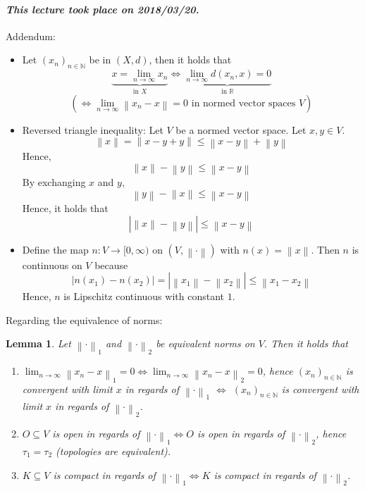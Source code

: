 \documentclass{article}
\newtheorem{lemma}{Lemma}  \numberwithin{lemma}{section}
\newcommand{\norm}[1]{\left\|#1\right\|}
\newcommand{\card}[1]{\left|#1\right|}
\newcommand{\dateref}[1]{\paragraph{\textit{This lecture took place on #1.}}}
\begin{document}
\dateref{2018/03/20}

Addendum:
\begin{itemize}
  \item Let $(x_n)_{n \in \mathbb N}$ be in $(X, d)$, then it holds that
    \[ \underbrace{x = \lim_{n\to\infty} x_n}_{\text{in } X} \iff \underbrace{\lim_{n\to\infty} d(x_n, x) = 0}_{\text{in } \mathbb R} \]
    \[ (\iff \lim_{n\to\infty} \norm{x_n - x} = 0 \text{ in normed vector spaces } V) \]
  \item Reversed triangle inequality: Let $V$ be a normed vector space. Let $x, y \in V$.
    \[ \norm{x} = \norm{x - y + y} \leq \norm{x - y} + \norm{y} \]
    Hence,
    \[ \norm{x} - \norm{y} \leq \norm{x - y} \]
    By exchanging $x$ and $y$,
    \[ \norm{y} - \norm{x} \leq \norm{x - y} \]
    Hence, it holds that
    \[ \card{\norm x - \norm y} \leq \norm{x - y} \]
  \item Define the map $n: V \to [0, \infty)$ on $(V, \norm{\cdot})$ with $n(x) = \norm{x}$.
    Then $n$ is continuous on $V$ because
    \[ \card{n(x_1) - n(x_2)} = \card{\norm{x_1} - \norm{x_2}} \leq \norm{x_1 - x_2} \]
    Hence, $n$ is Lipschitz continuous with constant $1$.
\end{itemize}

Regarding the equivalence of norms:

\begin{lemma} %
  Let $\norm{\cdot}_1$ and $\norm{\cdot}_2$ be equivalent norms on $V$. Then it holds that
  \begin{enumerate}
    \item $\lim_{n\to\infty} \norm{x_n - x}_1 = 0 \iff \lim_{n\to\infty} \norm{x_n - x}_2 = 0$,
      hence $(x_n)_{n\in\mathbb N}$ is convergent with limit $x$ in regards of $\norm{\cdot}_1$
      $\iff$ $(x_n)_{n\in\mathbb N}$ is convergent with limit $x$ in regards of $\norm{\cdot}_2$.
    \item $O \subseteq V$ is open in regards of $\norm{\cdot}_1 \iff O$ is open in regards of $\norm{\cdot}_2$,
      hence $\tau_1 = \tau_2$ (topologies are equivalent).
    \item $K \subseteq V$ is compact in regards of $\norm{\cdot}_1 \iff K$ is compact in regards of $\norm{\cdot}_2$.
  \end{enumerate}
\end{lemma}
\end{document}
